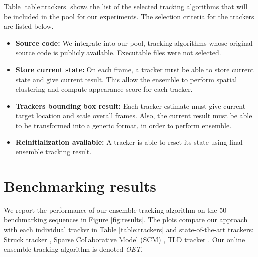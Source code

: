 Table \ref{table:trackers} shows the list of the
selected tracking algorithms that will be included in the pool for our
experiments. The selection criteria for the trackers are
listed below.
\begin{itemize}
\item \textbf{Source code: } We integrate into our pool, tracking algorithms
whose original source code is publicly available. Executable files were not
selected.
\item \textbf{Store current state: } On each frame, a tracker must be able to
store current state and give current result. This allow the ensemble to
perform spatial clustering and compute appearance score for each tracker.
\item \textbf{Trackers bounding box result: } Each tracker estimate must give
current target location and scale overall frames. Also, the current result
must be able to be transformed into a generic format, in order to perform ensemble.
\item \textbf{Reinitialization available: } A tracker is able to reset its
state using final ensemble tracking result.
\end{itemize}

\section{Benchmarking results}

We report the performance of our ensemble tracking algorithm on the 50
benchmarking sequences in
Figure \ref{fig:results}.
The plots compare our approach with each individual tracker
in Table \ref{table:trackers} and state-of-the-art trackers: Struck tracker
\cite{Hare2011}, Sparse Collaborative Model (SCM) \cite{Zhong2012}, TLD tracker
\cite{Kalal2011}. Our online ensemble tracking algorithm is denoted \textit{OET}.


